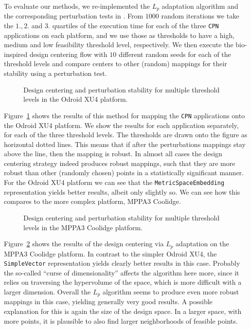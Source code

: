 To evaluate our methods, we re-implemented the $L_p$ adaptation algorithm and the corresponding perturbation tests in \mocasin. 
From $1000$ random iterations we take the $1.,2.$ and $3.$ quartiles of the execution time for each of the three \texttt{CPN} applications on each platform, and we use those as thresholds to have a high, medium and low feasibility threshold level, respectively.
We then execute the bio-inspired design centering flow with $10$ different random seeds for each of the threshold levels and compare centers to other (random) mappings for their stability using a perturbation test.

\begin{figure}[h]
	\centering
	\caption{Design centering and perturbation stability for multiple threshold levels in the Odroid XU4 platform.}
	\label{fig:design_centering_exynos}
\end{figure}

Figure~\ref{fig:design_centering_exynos} shows the results of this method for mapping the \texttt{CPN} applications onto the Odroid XU4 platform.
We show the results for each application separately, for each of the three threshold levels. The thresholds are drawn onto the figure as horizontal dotted lines. 
This means that if after the perturbations mappings stay above the line, then the mapping is robust.
In almost all cases the design centering strategy indeed produces robust mappings, such that they are more robust than other (randomly chosen) points in a statistically significant manner.
For the Odroid XU4 platform we can see that the \texttt{MetricSpaceEmbedding} representation yields better results, albeit only slightly so.
We can see how this compares to the more complex platform, MPPA3 Coolidge.

\begin{figure}[h]
	\centering
	\caption{Design centering and perturbation stability for multiple threshold levels in the MPPA3 Coolidge platform.}
	\label{fig:design_centering_coolidge}
\end{figure}

Figure~\ref{fig:design_centering_coolidge} shows the results of the design centering via $L_p$ adaptation on the MPPA3 Coolidge platform.
In contrast to the simpler Odroid XU4, the \texttt{SimpleVector} representation yields clearly better results in this case.
Probably the so-called ``curse of dimensionality'' affects the algorithm here more, since it relies on traversing the hypervolume of the space, which is more difficult with a larger dimension.
Overall the $L_p$ algorithm seems to produce even more robust mappings in this case, yielding generally very good results.
A possible explanation for this is again the size of the design space.
In a larger space, with more points, it is plausible to also find larger neighborhoods of feasible points.

